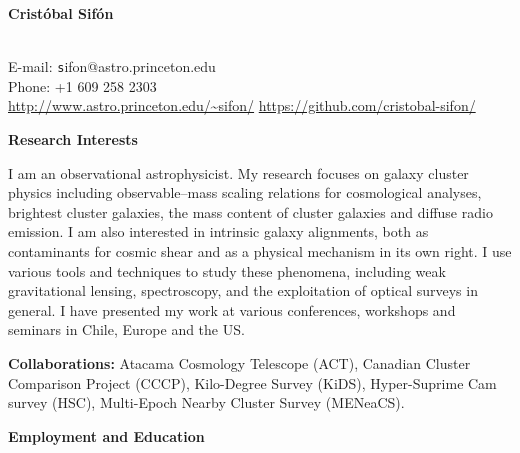 \documentclass[11pt]{article}
\newcommand\technical[2]{
  \noindent
    {\large\bf #1:} #2\\
  }
\newcommand\sectitle[1]{
  \vspace{0.5cm}
  \noindent
  \textbf{\large #1}\\
  \vspace{-0.2cm}
}
\begin{document}
\begin{minipage}[b]{0.46\linewidth}
\flushleft
\hspace{-0.7cm}
{\bf\huge Crist\'obal Sif\'on}\\\vspace{0.2cm}
\\
\end{minipage}
\begin{minipage}[b]{0.49\linewidth}
\flushright
{\large E-mail: {\texttt sifon@astro.princeton.edu}\\
        Phone: +1 609 258 2303\\
        \url{http://www.astro.princeton.edu/~sifon/}
        \url{https://github.com/cristobal-sifon/}}
\end{minipage}
\vspace{0.4cm}
\hline


\sectitle{Research Interests}

I am an observational astrophysicist. My research focuses on galaxy 
cluster physics including observable--mass scaling relations for cosmological 
analyses, brightest cluster galaxies, the mass content of cluster galaxies and 
diffuse radio emission. I am also interested in intrinsic galaxy alignments, both 
as contaminants for cosmic shear and as a physical mechanism in its own right. I 
use various tools and techniques to study these phenomena, including weak 
gravitational lensing, spectroscopy, and the exploitation of optical surveys in 
general. I have presented my work at various conferences, workshops and seminars 
in Chile, Europe and the US.

\technical{Collaborations}
{Atacama Cosmology Telescope (ACT), Canadian Cluster Comparison Project (CCCP), 
Kilo-Degree Survey (KiDS), Hyper-Suprime Cam survey (HSC),
Multi-Epoch Nearby Cluster Survey (MENeaCS).}


\vspace{-0.5cm}
\sectitle{Employment and Education}
\end{document}
